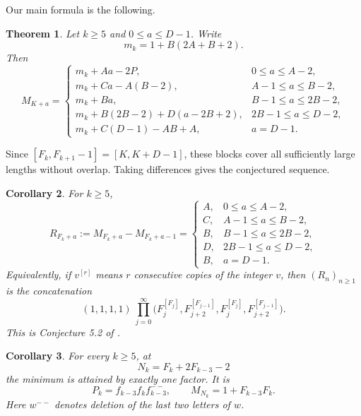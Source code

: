 \documentclass[11pt]{amsart}
\newtheorem{theorem}{Theorem}[section]
\newtheorem{corollary}[theorem]{Corollary}
\begin{document}
Our main formula is the following.

\begin{theorem}\label{thm:Mn}
Let $k\ge5$ and $0\le a\le D-1$.  Write
\begin{equation}\label{eq:mk}
 m_k=1+B(2A+B+2).
\end{equation}
Then
\begin{equation}\label{eq:Mpiece}
M_{K+a}=
\begin{cases}
 m_k+Aa-2P,&0\le a\le A-2,\\
 m_k+Ca-A(B-2),&A-1\le a\le B-2,\\
 m_k+Ba,&B-1\le a\le2B-2,\\
 m_k+B(2B-2)+D(a-2B+2),&2B-1\le a\le D-2,\\
 m_k+C(D-1)-AB+A,&a=D-1.
\end{cases}
\end{equation}
\end{theorem}

Since $[F_k,F_{k+1}-1]=[K,K+D-1]$, these blocks cover all sufficiently large lengths without overlap.  Taking differences gives the conjectured sequence.

\begin{corollary}\label{cor:R}
For $k\ge5$,
\begin{equation}\label{eq:Rpiece}
R_{F_k+a}:=M_{F_k+a}-M_{F_k+a-1}=
\begin{cases}
 A,&0\le a\le A-2,\\
 C,&A-1\le a\le B-2,\\
 B,&B-1\le a\le2B-2,\\
 D,&2B-1\le a\le D-2,\\
 B,&a=D-1.
\end{cases}
\end{equation}
Equivalently, if $v^{[r]}$ means $r$ consecutive copies of the integer $v$,
then $(R_n)_{n\ge1}$ is the concatenation
\[
 (1,1,1,1)\ \prod_{j=0}^{\infty}
 \bigl(F_j^{[F_j]},F_{j+2}^{[F_{j-1}]},
       F_j^{[F_j]},F_{j+2}^{[F_{j-1}]}\bigr).
\]
This is Conjecture 5.2 of \cite{MP}.
\end{corollary}

\begin{corollary}\label{cor:unique}
For every $k\ge5$, at
\[
 N_k=F_k+2F_{k-3}-2
\]
the minimum is attained by exactly one factor.  It is
\begin{equation}\label{eq:Pk}
 P_k=f_{k-3}f_kf_{k-3}^{--},
 \qquad
 M_{N_k}=1+F_{k-3}F_k.
\end{equation}
Here $w^{--}$ denotes deletion of the last two letters of $w$.
\end{corollary}
\end{document}
